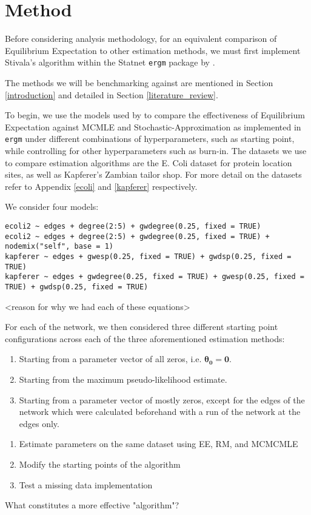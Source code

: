 \section{Method}


Before considering analysis methodology, for an equivalent comparison of Equilibrium Expectation to other estimation methods, we must first implement Stivala's algorithm within the Statnet \texttt{ergm} package by \cite{ergm}. 


The methods we will be benchmarking against are mentioned in Section \ref{introduction} and detailed in Section \ref{literature_review}.

To begin, we use the models used by \cite{hummels2012} to compare the effectiveness of Equilibrium Expectation against MCMLE and Stochastic-Approximation as implemented in \texttt{ergm} under different combinations of hyperparameters, such as starting point, while controlling for other hyperparameters such as burn-in. The datasets we use to compare estimation algorithms are the E. Coli dataset for protein location sites, as well as Kapferer's Zambian tailor shop. For more detail on the datasets refer to Appendix \ref{ecoli} and \ref{kapferer} respectively.

We consider four models:

\begin{lstlisting}
ecoli2 ~ edges + degree(2:5) + gwdegree(0.25, fixed = TRUE)
ecoli2 ~ edges + degree(2:5) + gwdegree(0.25, fixed = TRUE) + nodemix("self", base = 1)
kapferer ~ edges + gwesp(0.25, fixed = TRUE) + gwdsp(0.25, fixed = TRUE)
kapferer ~ edges + gwdegree(0.25, fixed = TRUE) + gwesp(0.25, fixed = TRUE) + gwdsp(0.25, fixed = TRUE)
\end{lstlisting}

<reason for why we had each of these equations>

For each of the network, we then considered three different starting point configurations across each of the three aforementioned estimation methods:
\begin{enumerate}
\item Starting from a parameter vector of all zeros, i.e. $\boldsymbol{\theta_0} = \boldsymbol{0}$.
\item Starting from the maximum pseudo-likelihood estimate.
\item Starting from a parameter vector of mostly zeros, except for the edges of the network which were calculated beforehand with a run of the network at the edges only.
\end{enumerate}

\begin{enumerate}
\item Estimate parameters on the same dataset using EE, RM, and MCMCMLE
\item Modify the starting points of the algorithm
\item Test a missing data implementation
\end{enumerate}

What constitutes a more effective "algorithm"?

